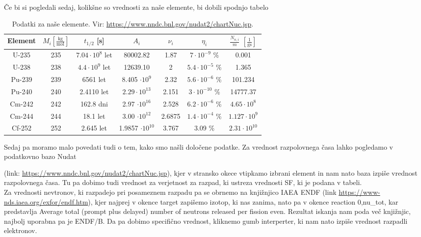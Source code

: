 \documentclass[slovene,11pt,a4paper]{article}
\begin{document}
Če bi si pogledali sedaj, kolikšne so vrednosti za naše elemente, bi dobili spodnjo tabelo
\begin{table}[h!]
\centering
 \begin{tabular}{|c | c | c | c | c| c |c|} 
 \hline
 Element & $M_i \left[\frac{\text{kg}}{\text{mol}}\right]$  & $t_{1/2} $ [s] & $A_i$ & $\nu_i$ &  $\eta_i$& $\frac{N_{n,i}}{m}$ $\left[\frac{1}{\text{gs}}\right]$ \\
 \hline
 U-235 & 235 & $7.04 \cdot 10^8$ let & 80002.82& 1.87 & $7  \cdot 10^{-9}$ \% &0.001   \\
 \hline
 U-238 & 238 & $4.4 \cdot 10^9$ let & 12639.10 & 2 & $5.4 \cdot 10^{-5}$ \% & 1.365\\
 \hline
  Pu-239 & 239 & 6561 let & 8.405 $\cdot 10^{9}$  & 2.32 & $5.6 \cdot 10^{-6}$ \% & 101.234 \\
 \hline
 Pu-240 & 240 & 2.4110 let &  $2.29\cdot 10^{13}$  & 2.151 & $3 \cdot 10^{-10}$ \% & 14777.37 \\
 \hline
 Cm-242 & 242 & 162.8 dni & 2.97 $\cdot 10^{16}$& 2.528 & $6.2 \cdot 10^{-6}$ \% & $4.65 \cdot 10^{8}$\\
 \hline
  Cm-244 & 244 & 18.1 let & 3.00 $\cdot 10^{12}$& 2.6875 & $1.4 \cdot 10^{-4}$ \% & $1.127 \cdot 10^{9}$\\
 \hline
 Cf-252 & 252 & 2.645 let & 1.9857 $\cdot 10^{10}$ & 3.767 &  3.09 \% &$2.31 \cdot 10^{10}$ \\
 \hline
 \end{tabular}
 \caption{Podatki za naše elemente. Vir: \url{https://www.nndc.bnl.gov/nudat2/chartNuc.jsp}.}
\end{table}


Sedaj pa moramo malo povedati tudi o tem, kako smo našli določene podatke.
Za vrednost razpolovnega časa lahko pogledamo v podatkovno bazo Nudat 

(link: \url{https://www.nndc.bnl.gov/nudat2/chartNuc.jsp}), kjer v stransko okece vtipkamo izbrani element in nam nato baza izpiše vrednost razpolovnega časa. Tu pa dobimo tudi vrednost za verjetnost za razpad, ki ustreza vrednosti SF, ki je podana v tabeli. \\
Za vrednosti nevtronov, ki razpadejo pri posameznem razpadu pa se obrnemo na knjižnjico IAEA ENDF 
(link \url{https://www-nds.iaea.org/exfor/endf.htm}), kjer najprej v okence target zapišemo izotop, ki nas zanima, nato pa v okence reaction 0,nu\_tot, kar predstavlja Average total (prompt plus delayed) number of neutrons released per fission even. Rezultat iskanja nam poda več knjižnjic, najbolj uporabna pa je ENDF/B. Da pa dobimo specifično vrednost, kliknemo gumb interperter, ki nam nato izpiše vrednost razpadli elektronov. 
\end{document}
